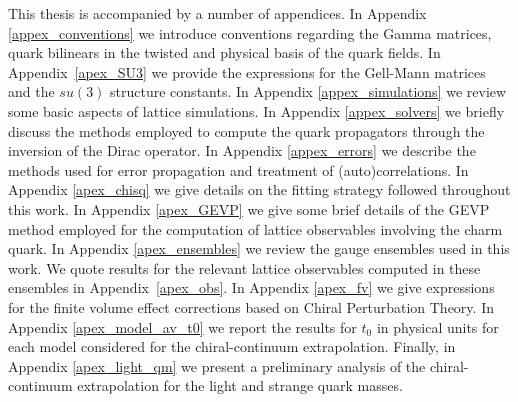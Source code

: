 This thesis is accompanied by a number of appendices. In Appendix \ref{appex_conventions} we introduce conventions regarding the Gamma matrices, quark bilinears in the twisted and physical basis of the quark fields. In Appendix~\ref{apex_SU3} we provide the expressions for the Gell-Mann matrices and the $su(3)$ structure constants. In Appendix \ref{appex_simulations} we review some basic aspects of lattice simulations. In Appendix \ref{appex_solvers} we briefly discuss the methods employed to compute the quark propagators through the inversion of the Dirac operator. In Appendix \ref{appex_errors} we describe the methods used for error propagation and treatment of (auto)correlations. In Appendix \ref{apex_chisq} we give details on the fitting strategy followed throughout this work. In Appendix \ref{apex_GEVP} we give some brief details of the GEVP method employed for the computation of lattice observables involving the charm quark. In Appendix \ref{apex_ensembles} we review the gauge ensembles used in this work. We quote results for the relevant lattice observables computed in these ensembles in Appendix~\ref{apex_obs}. In Appendix \ref{apex_fv} we give expressions for the  finite volume effect corrections based on Chiral Perturbation Theory. In Appendix \ref{apex_model_av_t0} we report the results for $t_0$ in physical units  for each model considered for the chiral-continuum extrapolation. Finally, in Appendix \ref{apex_light_qm} we present a preliminary analysis of the chiral-continuum extrapolation for the light and strange quark masses. 

